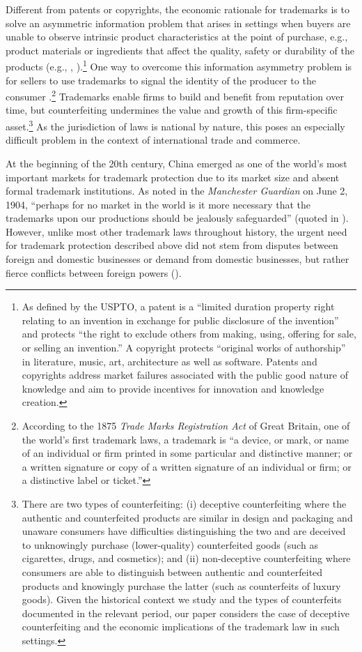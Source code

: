 \documentclass[12pt]{article}
\begin{document}
Different from patents or copyrights, the economic rationale for trademarks is to solve an asymmetric information problem that arises in settings when buyers are unable to observe intrinsic product characteristics at the point of purchase, e.g., product materials or ingredients that affect the quality, safety or durability of the products  (e.g., \citealp{Shapiro1982}, \citealp{Shapiro1983}).\footnote{As defined by the USPTO, a patent is a ``limited duration property right relating to an invention in exchange for public disclosure of the invention'' and protects ``the right to exclude others from making, using, offering for sale, or selling an invention.'' A copyright protects ``original works of authorship'' in literature, music, art, architecture as well as software. Patents and copyrights address market failures associated with the public good nature of knowledge and aim to provide incentives for innovation and knowledge creation.} One way to overcome this information asymmetry problem is for sellers to use trademarks to signal the identity of the producer to the consumer \citep{GrossmanShapiro1988aer}.\footnote{According to the 1875 \emph{Trade Marks Registration Act} of Great Britain, one of the world's first trademark laws, a trademark is ``a device, or mark, or name of an individual or firm printed in some particular and distinctive manner; or a written signature or copy of a written signature of an individual or firm; or a distinctive label or ticket.''} Trademarks enable firms to build and benefit from reputation over time, but counterfeiting undermines the value and growth of this firm-specific asset.\footnote{There are two types of counterfeiting: (i) deceptive counterfeiting where the authentic and counterfeited products are similar in design and packaging and unaware consumers have difficulties distinguishing the two and are deceived to unknowingly purchase (lower-quality) counterfeited goods (such as cigarettes, drugs, and cosmetics); and (ii) non-deceptive counterfeiting where consumers are able to distinguish between authentic and counterfeited products and knowingly purchase the latter (such as counterfeits of luxury goods). Given the historical context we study and the types of counterfeits documented in the relevant period, our paper considers the case of deceptive counterfeiting and the economic implications of the trademark law in such settings.} As the jurisdiction of laws is national by nature, this poses an especially difficult problem in the context of international trade and commerce.

At the beginning of the 20th century, China emerged as one of the world's most important markets for trademark protection due to its market size and absent formal trademark institutions. As noted in the \emph{Manchester Guardian} on June 2, 1904, ``perhaps for no market in the world is it more necessary that the trademarks upon our productions should be jealously safeguarded'' (quoted in \citealp{Heuser1975}). However, unlike most other trademark laws throughout history, the urgent need for trademark protection described above did not stem from disputes between foreign and domestic businesses or demand from domestic businesses, but rather fierce conflicts between foreign powers (\citealp{Motono2011}).
\end{document}
